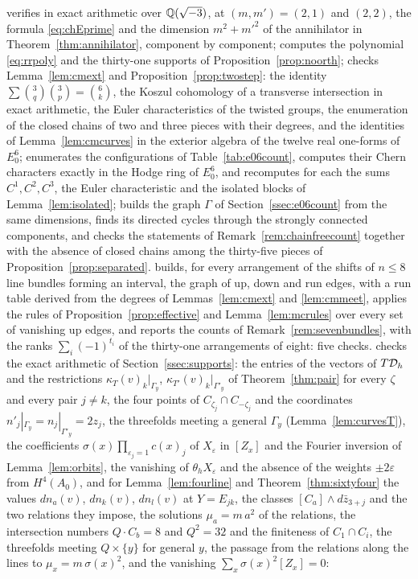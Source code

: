  verifies in exact arithmetic over $\mathbb{Q}(\sqrt{-3})$, at $(m,m')=(2,1)$ and $(2,2)$, the formula \eqref{eq:chEprime} and the dimension $m^{2}+m'^{2}$ of the annihilator in Theorem~\ref{thm:annihilator}, component by component;  computes the polynomial \eqref{eq:rrpoly} and the thirty-one supports of Proposition~\ref{prop:noorth};  checks Lemma~\ref{lem:cmext} and Proposition~\ref{prop:twostep}: the identity $\sum\binom{3}{q}\binom{3}{p}=\binom{6}{k}$, the Koszul cohomology of a transverse intersection in exact arithmetic, the Euler characteristics of the twisted groups, the enumeration of the closed chains of two and three pieces with their degrees, and the identities of Lemma~\ref{lem:cmcurves} in the exterior algebra of the twelve real one-forms of $E_{0}^{6}$;  enumerates the configurations of Table~\ref{tab:e06count}, computes their Chern characters exactly in the Hodge ring of $E_{0}^{6}$, and recomputes for each the sums $C^{1},C^{2},C^{3}$, the Euler characteristic and the isolated blocks of Lemma~\ref{lem:isolated};  builds the graph $\Gamma$ of Section~\ref{ssec:e06count} from the same dimensions, finds its directed cycles through the strongly connected components, and checks the statements of Remark~\ref{rem:chainfreecount} together with the absence of closed chains among the thirty-five pieces of Proposition~\ref{prop:separated}.  builds, for every arrangement of the shifts of $n\le8$ line bundles forming an interval, the graph of up, down and run edges, with a run table derived from the degrees of Lemmas~\ref{lem:cmext} and \ref{lem:cmmeet}, applies the rules of Proposition~\ref{prop:effective} and Lemma~\ref{lem:mcrules} over every set of vanishing up edges, and reports the counts of Remark~\ref{rem:sevenbundles}, with the ranks $\sum_{i}(-1)^{t_{i}}$ of the thirty-one arrangements of eight: five checks.  checks the exact arithmetic of Section~\ref{ssec:supports}: the entries of the vectors of $T\mathcal{D}_{h}$ and the restrictions $\kappa_{T}(v)_{k}|_{\Gamma_{y}}$, $\kappa_{T'}(v)_{k}|_{\Gamma'_{y}}$ of Theorem~\ref{thm:pair} for every $\zeta$ and every pair $j\ne k$, the four points of $C_{\zeta_{j}}\cap C_{-\zeta_{j}}$ and the coordinates $n'_{j}|_{\Gamma_{y}}=n_{j}|_{\Gamma'_{y}}=2z_{j}$, the threefolds meeting a general $\Gamma_{y}$ (Lemma~\ref{lem:curvesT}), the coefficients $\sigma(x)\prod_{\varepsilon_{j}=1}c(x)_{j}$ of $X_{\varepsilon}$ in $[Z_{x}]$ and the Fourier inversion of Lemma~\ref{lem:orbits}, the vanishing of $\theta_{h}X_{\varepsilon}$ and the absence of the weights $\pm2\varepsilon$ from $H^{4}(A_{0})$, and for Lemma~\ref{lem:fourline} and Theorem~\ref{thm:sixtyfour} the values $dn_{a}(v)$, $dn_{k}(v)$, $dn_{l}(v)$ at $Y=E_{jk}$, the classes $[C_{a}]\wedge d\bar z_{3+j}$ and the two relations they impose, the solutions $\mu_{a}=m\,a^{2}$ of the relations, the intersection numbers $Q\cdot C_{b}=8$ and $Q^{2}=32$ and the finiteness of $C_{1}\cap C_{i}$, the threefolds meeting $Q\times\{y\}$ for general $y$, the passage from the relations along the lines to $\mu_{x}=m\,\sigma(x)^{2}$, and the vanishing $\sum_{x}\sigma(x)^{2}[Z_{x}]=0$: 